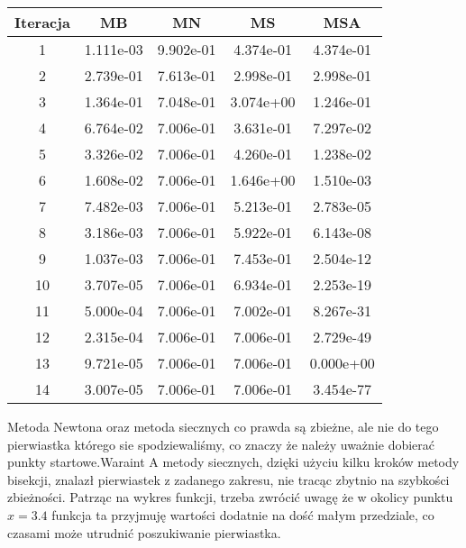 \documentclass[11pt,wide]{article}
\begin{document}
\begin{center}
    \begin{tabular}{| c | c | c | c | c |}
    \hline
    Iteracja & MB & MN & MS & MSA \\ \hline \hline
	1 & 1.111e-03 & 9.902e-01 & 4.374e-01 & 4.374e-01 \\ \hline
	2 & 2.739e-01 & 7.613e-01 & 2.998e-01 & 2.998e-01 \\ \hline
	3 & 1.364e-01 & 7.048e-01 & 3.074e+00 & 1.246e-01 \\ \hline
	4 & 6.764e-02 & 7.006e-01 & 3.631e-01 & 7.297e-02 \\ \hline
	5 & 3.326e-02 & 7.006e-01 & 4.260e-01 & 1.238e-02 \\ \hline
	6 & 1.608e-02 & 7.006e-01 & 1.646e+00 & 1.510e-03 \\ \hline
	7 & 7.482e-03 & 7.006e-01 & 5.213e-01 & 2.783e-05 \\ \hline
	8 & 3.186e-03 & 7.006e-01 & 5.922e-01 & 6.143e-08 \\ \hline
	9 & 1.037e-03 & 7.006e-01 & 7.453e-01 & 2.504e-12 \\ \hline
	10 & 3.707e-05 & 7.006e-01 & 6.934e-01 & 2.253e-19 \\ \hline
	11 & 5.000e-04 & 7.006e-01 & 7.002e-01 & 8.267e-31 \\ \hline
	12 & 2.315e-04 & 7.006e-01 & 7.006e-01 & 2.729e-49 \\ \hline
	13 & 9.721e-05 & 7.006e-01 & 7.006e-01 & 0.000e+00 \\ \hline
	14 & 3.007e-05 & 7.006e-01 & 7.006e-01 & 3.454e-77 \\ \hline
    \end{tabular}
\end{center}
\noindent
Metoda Newtona oraz metoda siecznych co prawda są zbieżne, ale nie do tego pierwiastka którego sie spodziewaliśmy, co znaczy że należy uważnie dobierać punkty startowe.Waraint A metody siecznych, dzięki użyciu kilku kroków metody bisekcji, znalazł pierwiastek z zadanego zakresu, nie tracąc zbytnio na szybkości zbieżności. Patrząc na wykres funkcji, trzeba zwrócić uwagę że w okolicy punktu $x = 3.4$ funkcja ta przyjmuję wartości dodatnie na dość małym przedziale, co czasami może utrudnić poszukiwanie pierwiastka.
\end{document}

